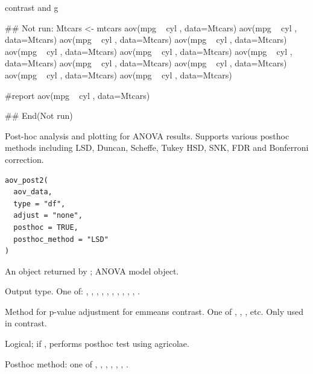 \documentclass[a4paper]{book}
\begin{document}
%
\begin{Value}
contrast and g
\end{Value}
%
\begin{Examples}
\begin{ExampleCode}

\#\# Not run: 
Mtcars <- mtcars%
aov(mpg ~ cyl , data=Mtcars)%
aov(mpg ~ cyl , data=Mtcars)%
aov(mpg ~ cyl , data=Mtcars)%
aov(mpg ~ cyl , data=Mtcars)%
aov(mpg ~ cyl , data=Mtcars)%
aov(mpg ~ cyl , data=Mtcars)%
aov(mpg ~ cyl , data=Mtcars)%
aov(mpg ~ cyl , data=Mtcars)%
aov(mpg ~ cyl , data=Mtcars)%
aov(mpg ~ cyl , data=Mtcars)%
aov(mpg ~ cyl , data=Mtcars)%

#report
aov(mpg ~ cyl , data=Mtcars)%

## End(Not run)


\end{ExampleCode}
\end{Examples}
%
\begin{Description}
Post-hoc analysis and plotting for ANOVA results. Supports various posthoc methods
including LSD, Duncan, Scheffe, Tukey HSD, SNK, FDR and Bonferroni correction.
\end{Description}
%
\begin{Usage}
\begin{verbatim}
aov_post2(
  aov_data,
  type = "df",
  adjust = "none",
  posthoc = TRUE,
  posthoc_method = "LSD"
)
\end{verbatim}
\end{Usage}
%
\begin{Arguments}
\begin{ldescription}
\item[\code{aov\_data}] An object returned by ; ANOVA model object.

\item[\code{type}] Output type. One of: , , ,
, , , , , ,
, .

\item[\code{adjust}] Method for p-value adjustment for emmeans contrast. One of ,
, , etc. Only used in contrast.

\item[\code{posthoc}] Logical; if , performs posthoc test using agricolae.

\item[\code{posthoc\_method}] Posthoc method: one of , ,
, , , , .
\end{ldescription}
\end{Arguments}
\end{document}
